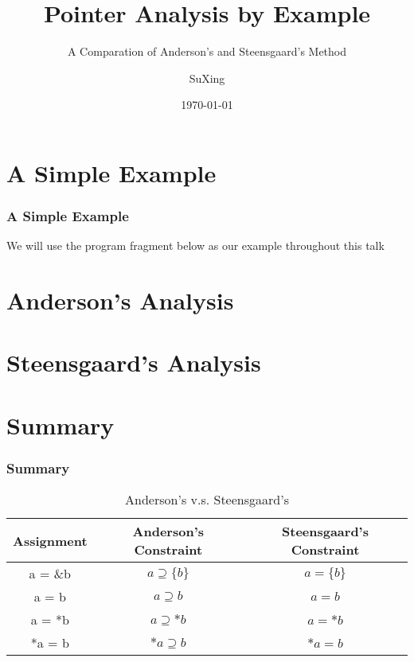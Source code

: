 \documentclass[]{beamer}
\title{Pointer Analysis by Example}
\subtitle{A Comparation of Anderson's and Steensgaard's Method}
\author[SuXing~pysuxing@gmail.com]{SuXing}
\institute{TOW}
\date{\today}
\begin{document}
\setlength{\parindent}{0pt}

\frame{\titlepage}
\frame{\tableofcontents}

\section{A Simple Example}
\frame{\tableofcontents[currentsection]}

\begin{frame}
  \frametitle{A Simple Example}
  We will use the program fragment below as our example throughout
  this talk
\end{frame}

\section{Anderson's Analysis}
\frame{\tableofcontents[currentsection]}

\begin{frame}
  \frametitle{}
\end{frame}

\section{Steensgaard's Analysis}
\frame{\tableofcontents[currentsection]}

\begin{frame}
  \frametitle{}
\end{frame}

\section{Summary}
\frame{\tableofcontents[currentsection]}

\begin{frame}
  \frametitle{Summary}
  \begin{table}
    \begin{tabular}{|c|c|c|}
      \hline
      Assignment & Anderson's Constraint & Steensgaard's Constraint\\
      \hline
      a = \&b & $a \supseteq \{b\}$ & $a = \{b\}$\\
      a = b & $a \supseteq b$ & $a = b$\\
      a = *b & $a \supseteq *b$ & $a = *b$ \\
      *a = b & $*a \supseteq b$ & $*a = b$\\
      \hline
    \end{tabular}
    \caption{Anderson's v.s. Steensgaard's}
  \end{table}
\end{frame}
\end{document}
